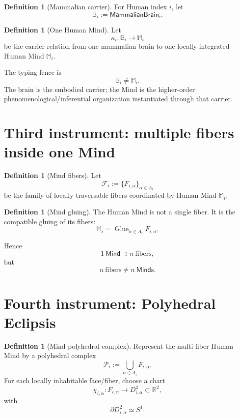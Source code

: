 \documentclass[10pt]{article}
\theoremstyle{pe}
\theoremstyle{definition}
\newtheorem{definition}[theorem]{Definition}
\newcommand{\Glue}{\operatorname{Glue}}
\newcommand{\Mind}{\mathsf{Mind}}
\newcommand{\Brain}{\mathsf{MammalianBrain}}
\begin{document}
\begin{definition}[Mammalian carrier]
For Human index \(i\), let
\[
  \mathbb B_i:=\Brain_i.
\]
\end{definition}

\begin{definition}[One Human Mind]
Let
\[
  \kappa_i:\mathbb B_i\longrightarrow \mathbb M_i
\]
be the carrier relation from one mammalian brain to one locally integrated Human Mind \(\mathbb M_i\).
\end{definition}

The typing fence is
\[
  \boxed{\mathbb B_i\neq\mathbb M_i.}
\]
The brain is the embodied carrier; the Mind is the higher-order phenomenological/inferential organization instantiated through that carrier.

\section{Third instrument: multiple fibers inside one Mind}

\begin{definition}[Mind fibers]
Let
\[
  \mathcal F_i:=\{F_{i,\alpha}\}_{\alpha\in A_i}
\]
be the family of locally traversable fibers coordinated by Human Mind \(\mathbb M_i\).
\end{definition}

\begin{definition}[Mind gluing]
The Human Mind is not a single fiber.  It is the compatible gluing of its fibers:
\begin{equation}\label{eq:mind-glue}
  \boxed{
  \mathbb M_i
  =
  \Glue_{\alpha\in A_i}F_{i,\alpha}.
  }
\end{equation}
\end{definition}

Hence
\[
  1\ \Mind
  \supset
  n\ \text{fibers},
\]
but
\[
  n\ \text{fibers}\neq n\ \Mind\text{s}.
\]

\section{Fourth instrument: Polyhedral Eclipsis}

\begin{definition}[Mind polyhedral complex]
Represent the multi-fiber Human Mind by a polyhedral complex
\[
  \mathcal P_i
  :=
  \bigcup_{\alpha\in A_i}F_{i,\alpha}.
\]
For each locally inhabitable face/fiber, choose a chart
\[
  \chi_{i,\alpha}:F_{i,\alpha}\longrightarrow D^2_{i,\alpha}\subset\mathbb R^2,
\]
with
\[
  \partial D^2_{i,\alpha}\simeq S^1.
\]
\end{definition}
\end{document}
